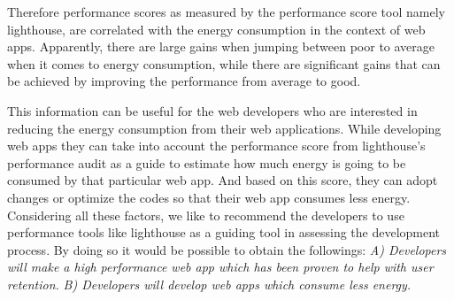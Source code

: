 Therefore performance scores as measured by the performance score tool namely lighthouse, are correlated with the energy consumption in the context of web apps. Apparently, there are large gains when jumping between poor to average when it comes to energy consumption, while there are significant gains that can be achieved by improving the performance from average to good.\newline

This information can be useful for the web developers who are interested in reducing the energy consumption from their web applications. While developing web apps they can take into account the performance score from lighthouse's performance audit as a guide to estimate how much energy is going to be consumed by that particular web app. And based on this score, they can adopt changes or optimize the codes so that their web app consumes less energy. Considering all these factors, we like to recommend the developers to use performance tools like lighthouse as a guiding tool in assessing the development process. By doing so it would be possible to obtain the followings:\newline
\textit{A) Developers will make a high performance web app which has been proven to help with user retention.}\newline
\textit{B) Developers will develop web apps which consume less energy.}


